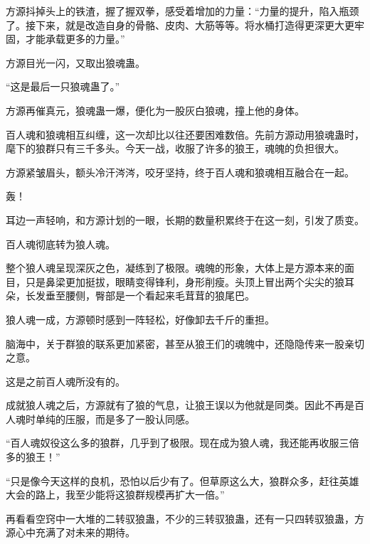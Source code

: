 \begin{this_body}
方源抖掉头上的铁渣，握了握双拳，感受着增加的力量：“力量的提升，陷入瓶颈了。接下来，就是改造自身的骨骼、皮肉、大筋等等。将水桶打造得更深更大更牢固，才能承载更多的力量。”

方源目光一闪，又取出狼魂蛊。

“这是最后一只狼魂蛊了。”

方源再催真元，狼魂蛊一爆，便化为一股灰白狼魂，撞上他的身体。

百人魂和狼魂相互纠缠，这一次却比以往还要困难数倍。先前方源动用狼魂蛊时，麾下的狼群只有三千多头。今天一战，收服了许多的狼王，魂魄的负担很大。

方源紧皱眉头，额头冷汗涔涔，咬牙坚持，终于百人魂和狼魂相互融合在一起。

轰！

耳边一声轻响，和方源计划的一眼，长期的数量积累终于在这一刻，引发了质变。

百人魂彻底转为狼人魂。

整个狼人魂呈现深灰之色，凝练到了极限。魂魄的形象，大体上是方源本来的面目，只是鼻梁更加挺拔，眼睛变得锋利，身形削瘦。头顶上冒出两个尖尖的狼耳朵，长发垂至腰侧，臀部是一个看起来毛茸茸的狼尾巴。

狼人魂一成，方源顿时感到一阵轻松，好像卸去千斤的重担。

脑海中，关于群狼的联系更加紧密，甚至从狼王们的魂魄中，还隐隐传来一股亲切之意。

这是之前百人魂所没有的。

成就狼人魂之后，方源就有了狼的气息，让狼王误以为他就是同类。因此不再是百人魂时单纯的压服，而是多了一股认同感。

“百人魂奴役这么多的狼群，几乎到了极限。现在成为狼人魂，我还能再收服三倍多的狼王！”

“只是像今天这样的良机，恐怕以后少有了。但草原这么大，狼群众多，赶往英雄大会的路上，我至少能将这狼群规模再扩大一倍。”

再看看空窍中一大堆的二转驭狼蛊，不少的三转驭狼蛊，还有一只四转驭狼蛊，方源心中充满了对未来的期待。

\end{this_body}

